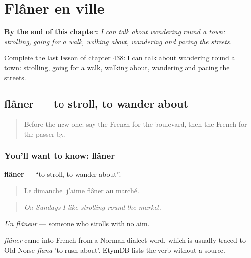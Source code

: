 
\chapter{Flâner en ville}
\label{ch:fr-flaner-en-ville}

\begin{chapteropening}
\textbf{By the end of this chapter:} \emph{I can talk about wandering round a town: strolling, going for a walk, walking about, wandering and pacing the streets.}

Complete the last lesson of chapter 438: I can talk about wandering round a town: strolling, going for a walk, walking about, wandering and pacing the streets.
\end{chapteropening}

\section[flâner]{flâner — to stroll, to wander about}

\label{lesson:FR-C438-flaner}



\begin{quote}
Before the new one: say the French for the boulevard, then the French for the passer-by.
\end{quote}

\subsection*{You'll want to know: flâner}
\textbf{flâner} — \textquotedblleft{}to stroll, to wander about\textquotedblright{}.

\begin{quote}
Le dimanche, j'aime flâner au marché.
\end{quote}

\begin{quote}
\emph{On Sundays I like strolling round the market.}
\end{quote}

\emph{Un flâneur} — someone who strolls with no aim.

\begin{cousinweb}
\emph{flâner} came into French from a Norman dialect word, which is usually traced to Old Norse \emph{flana} 'to rush about'. EtymDB lists the verb without a source.
\end{cousinweb}

